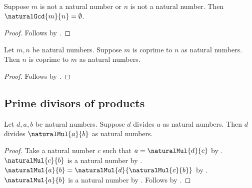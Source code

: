 \begin{proposition}\label{spike15_natural_gcd_off_domain}
    Suppose $m$ is not a natural number or $n$ is not a natural number.
    Then $\naturalGcd{m}{n}=\emptyset$.
\end{proposition}
\begin{proof}
    Follows by
        .
\end{proof}

\begin{proposition}\label{spike15_coprime_naturals_symmetric}
    Let $m,n$ be natural numbers.
    Suppose $m$ is coprime to $n$ as natural numbers.
    Then $n$ is coprime to $m$ as natural numbers.
\end{proposition}
\begin{proof}
    Follows by
        .
\end{proof}

\subsection{Prime divisors of products}

\begin{proposition}\label{spike15_divisor_divides_multiple}
    Let $d,a,b$ be natural numbers.
    Suppose $d$ divides $a$ as natural numbers.
    Then $d$ divides $\naturalMul{a}{b}$ as natural numbers.
\end{proposition}
\begin{proof}
    Take a natural number $c$ such that $a=\naturalMul{d}{c}$
        by .
    $\naturalMul{c}{b}$ is a natural number
        by .
    $\naturalMul{a}{b}=\naturalMul{d}{\naturalMul{c}{b}}$
        by .
    $\naturalMul{a}{b}$ is a natural number
        by .
    Follows by .
\end{proof}

